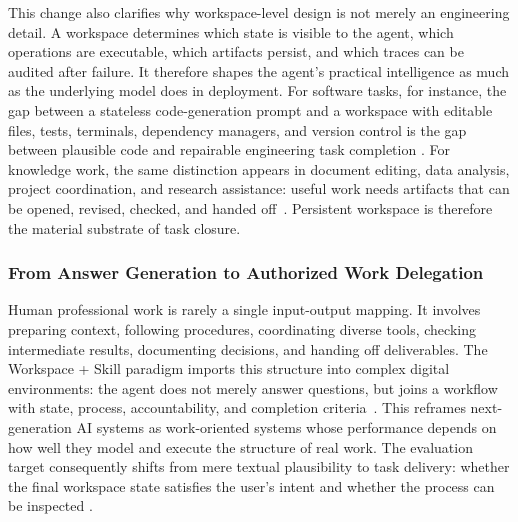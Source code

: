 This change also clarifies why workspace-level design is not merely an engineering detail.
A workspace determines which state is visible to the agent, which operations are executable, which artifacts persist, and which traces can be audited after failure.
It therefore shapes the agent's practical intelligence as much as the underlying model does in deployment.
For software tasks, for instance, the gap between a stateless code-generation prompt and a workspace with editable files, tests, terminals, dependency managers, and version control is the gap between plausible code and repairable engineering task completion \citep{yang2024sweagent,jimenez2023swebench,chancoding,chen2026skillcraft,xu2026agent,cai2024large,shi2025tool}.
For knowledge work, the same distinction appears in document editing, data analysis, project coordination, and research assistance: useful work needs artifacts that can be opened, revised, checked, and handed off~\citep{chen2026cua,lumer2026tool,liupolicy,paranjape2023art,gantayat2026dfagent}.
Persistent workspace is therefore the material substrate of task closure.

\subsubsection{From Answer Generation to Authorized Work Delegation}

Human professional work is rarely a single input-output mapping.
It involves preparing context, following procedures, coordinating diverse tools, checking intermediate results, documenting decisions, and handing off deliverables.
The Workspace + Skill paradigm imports this structure into complex digital environments: the agent does not merely answer questions, but joins a workflow with state, process, accountability, and completion criteria~\citep{huang2026raw,zhang2026formal,zhangkeeps,chen2024t,zhang2026evoagent}.
This reframes next-generation AI systems as work-oriented systems whose performance depends on how well they model and execute the structure of real work.
The evaluation target consequently shifts from mere textual plausibility to task delivery: whether the final workspace state satisfies the user's intent and whether the process can be inspected \citep{xie2024osworld,zhou2023webarena,drouin2024workarena,theagentcompany2024,niu2024screenagent,naveen2025command,liu2024large,sheng2024language,chatlatanagulchai2025agent}.

